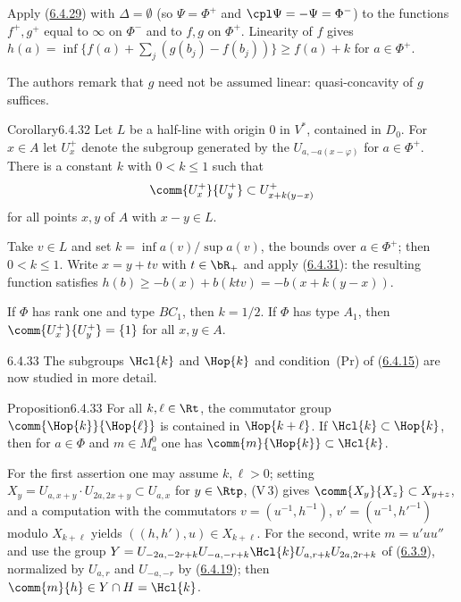 \documentclass[12pt,a4paper,oneside,english]{smfart}
\makeatletter
\newcommand{\btanchor}[1]{\leavevmode\Hy@raisedlink{\hypertarget{bt:#1}{}}}
\newcommand{\btref}[1]{\hyperlink{bt:#1}{#1}}
\theoremstyle{definition}
\theoremstyle{bt}
\makeatother
\begin{document}
\begin{sketch}
Apply (\btref{6.4.29}) with $\Delta=\emptyset$ (so $\Psi=\Phi^{+}$ and
$\cpl\Psi=-\Psi=\Phi^{-}$) to the functions $f^{+},g^{+}$ equal to
$\infty$ on $\Phi^{-}$ and to $f,g$ on $\Phi^{+}$. Linearity of $f$ gives
$h(a)=\inf\{f(a)+\sum_j(g(b_j)-f(b_j))\}\ge f(a)+k$ for $a\in\Phi^{+}$.
\end{sketch}

\noindent
The authors remark that $g$ need not be assumed linear: quasi-concavity
of $g$ suffices.

\begin{bt}{Corollary}{6.4.32}\btanchor{6.4.32}
Let $L$ be a half-line with origin $0$ in $V^{*}$, contained in $D_0$.
For $x\in A$ let $U^{+}_{x}$ denote the subgroup generated by the
$U_{a,-a(x-\varphi)}$ for $a\in\Phi^{+}$. There is a constant $k$ with
$0<k\le1$ such that
\[
  \comm{U^{+}_{x}}{U^{+}_{y}}\subset U^{+}_{x+k(y-x)}
\]
for all points $x,y$ of $A$ with $x-y\in L$.
\end{bt}

\begin{sketch}
Take $v\in L$ and set $k=\inf a(v)/\sup a(v)$, the bounds over
$a\in\Phi^{+}$; then $0<k\le1$. Write $x=y+tv$ with $t\in\bR_{+}$ and
apply (\btref{6.4.31}): the resulting function satisfies
$h(b)\ge -b(x)+b(ktv)=-b(x+k(y-x))$.
\end{sketch}

\noindent
If $\Phi$ has rank one and type $BC_1$, then $k=1/2$. If $\Phi$ has type
$A_1$, then $\comm{U^{+}_{x}}{U^{+}_{y}}=\{1\}$ for all $x,y\in A$.

\begin{btpar}{6.4.33}
The subgroups $\Hcl{k}$ and $\Hop{k}$ and condition~(Pr) of (\btref{6.4.15}) are
now studied in more detail.
\end{btpar}

\begin{bt}{Proposition}{6.4.33}\btanchor{6.4.33}
For all $k,\ell\in\Rt$, the commutator group
$\comm{\Hop{k}}{\Hop{\ell}}$ is contained in $\Hop{k+\ell}$. If
$\Hcl{k}\subset\Hop{k}$, then for $a\in\Phi$ and $m\in M^{0}_{a}$ one has
$\comm{m}{\Hop{k}}\subset\Hcl{k}$.
\end{bt}

\begin{sketch}
For the first assertion one may assume $k,\ell>0$; setting
$X_y=U_{a,x+y}\cdot U_{2a,2x+y}\subset U_{a,x}$ for $y\in\Rtp$, (V\,3)
gives $\comm{X_y}{X_z}\subset X_{y+z}$, and a computation with the
commutators $v=(u^{-1},h^{-1})$, $v'=(u^{-1},h'^{-1})$ modulo
$X_{k+\ell}$ yields $((h,h'),u)\in X_{k+\ell}$. For the second, write
$m=u'uu''$ and use the group
$Y=U_{-2a,-2r+k}U_{-a,-r+k}\Hcl{k}U_{a,r+k}U_{2a,2r+k}$ of (\btref{6.3.9}),
normalized by $U_{a,r}$ and $U_{-a,-r}$ by (\btref{6.4.19}); then
$\comm{m}{h}\in Y\cap H=\Hcl{k}$.
\end{sketch}
\end{document}
